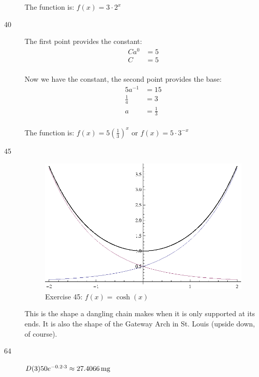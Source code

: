 \documentclass{exam}
\begin{document}
\begin{description}
        The function is: $f(x) = 3 \cdot 2^x$

      \item[40]
        The first point provides the constant:
        \begin{align*}
          Ca^0 &= 5 \\
          C    &= 5 \\
        \end{align*}

        Now we have the constant, the second point provides the base:
        \begin{align*}
          5a^{-1}     &= 15 \\
          \frac{1}{a} &= 3 \\
          a           &= \frac{1}{3} \\
        \end{align*}

        The function is: $f(x) = 5 \left( \frac{1}{3} \right)^x$ or $f(x) = 5 \cdot 3^{-x}$

      \item[45] 
        \begin{figure}[H]
          \centering
          \includegraphics[scale=0.9]{exercise45.eps}
          \caption*{Exercise 45: $f(x) = \cosh(x)$}
        \end{figure}

        This is the shape a dangling chain makes when it is only supported at its ends.  It is also the shape of the
        Gateway Arch in St. Louis (upside down, of course).

      \item[64] $D(3) 50 e^{-0.2 \cdot 3} \approx \unit[27.4066]{mg}$


\end{description}
\end{document}
